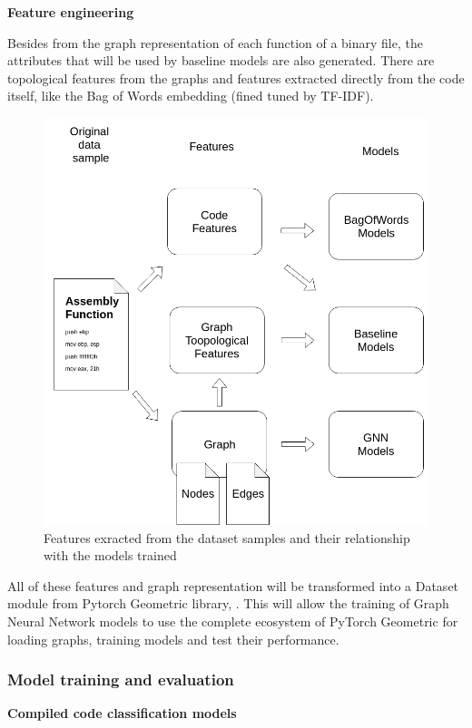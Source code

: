 \textbf{Feature engineering}


Besides from the graph representation of each function of a binary file, the attributes that will be used by baseline models are also generated. There are topological features from the graphs and features extracted directly from the code itself, like the Bag of Words embedding (fined tuned by TF-IDF).




\begin{figure}[H]
    \centering
        \includegraphics[width=0.55\linewidth]{img/Features_and_models_diagram.png}
    \caption{Features exracted from the dataset samples and their relationship with the models trained}\label{fig:Features_diagram}
\end{figure}

All of these features and graph representation will be transformed into a Dataset module from Pytorch Geometric library, \cite{fey2019fast}. This will allow the training of Graph Neural Network models to use the complete ecosystem of PyTorch Geometric for loading graphs, training models and test their performance.





\subsubsection{Model training and evaluation}




\textbf{Compiled code classification models}

